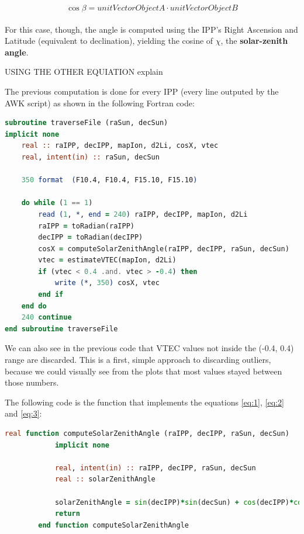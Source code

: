 \begin{equation} \label{eq:3}
\cos \beta = unitVectorObjectA \cdot unitVectorObjectB
\end{equation}\\

For this case, though, the angle is computed using the IPP's Right Ascension and Latitude (equivalent to declination), yielding the cosine of $\chi$, the \textbf{solar-zenith angle}.

USING THE OTHER EQUIATION explain

The previous computation is done for every IPP (every line outputed by the AWK script) as shown in the following Fortran code:

\begin{lstlisting}[language=Fortran, caption=Reading the content of the file and storing the computations for plotting]
subroutine traverseFile (raSun, decSun)
implicit none
	real :: raIPP, decIPP, mapIon, d2Li, cosX, vtec
	real, intent(in) :: raSun, decSun

	350 format  (F10.4, F10.4, F15.10, F15.10)
	
	do while (1 == 1)
		read (1, *, end = 240) raIPP, decIPP, mapIon, d2Li
		raIPP = toRadian(raIPP)
		decIPP = toRadian(decIPP)
		cosX = computeSolarZenithAngle(raIPP, decIPP, raSun, decSun)
		vtec = estimateVTEC(mapIon, d2Li)
		if (vtec < 0.4 .and. vtec > -0.4) then
			write (*, 350) cosX, vtec
		end if
	end do
	240 continue
end subroutine traverseFile
\end{lstlisting}

We can also see in the previous code that VTEC values not inside the (-0.4, 0.4) range are discarded. This is a first, simple approach to discarding outliers, because we could visually see from the plots that most values stayed between those numbers.

The following code is the function that implements the equations \ref{eq:1}, \ref{eq:2} and \ref{eq:3}:

\begin{lstlisting}[language=Fortran, caption=Computation of the solar-zenith a angle]
real function computeSolarZenithAngle (raIPP, decIPP, raSun, decSun)
			implicit none

			real, intent(in) :: raIPP, decIPP, raSun, decSun
			real :: solarZenithAngle
			
			solarZenithAngle = sin(decIPP)*sin(decSun) + cos(decIPP)*cos(decSun)*cos(raIPP - raSun)
			return
		end function computeSolarZenithAngle
\end{lstlisting}

